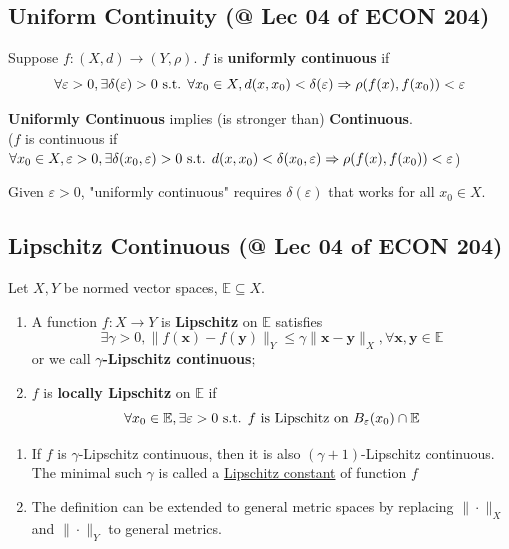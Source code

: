 \documentclass[11pt]{elegantbook}
\begin{document}
\subsection{Uniform Continuity \small{(@ Lec 04 of ECON 204)}}
\begin{definition}
\normalfont
    Suppose $f : (X, d) \rightarrow (Y, \rho)$. $f$ is \textbf{uniformly continuous} if $$\forall \varepsilon>0, \exists \delta(\varepsilon)>0 \textnormal{ s.t. }\forall x_0\in X, d(x,x_0)<\delta(\varepsilon) \Rightarrow \rho(f(x), f(x_0))<\varepsilon$$
\end{definition}
\begin{claim}
    \textbf{Uniformly Continuous} implies (is stronger than) \textbf{Continuous}.\\
    ($f$ is continuous if $\forall x_0\in X, \varepsilon>0, \exists \delta(x_0,\varepsilon)>0 \textnormal{ s.t. } d(x,x_0)<\delta(x_0,\varepsilon) \Rightarrow \rho(f(x), f(x_0))<\varepsilon$)
\end{claim}
Given $\varepsilon>0$, "uniformly continuous" requires $\delta(\varepsilon)$ that works for all $x_0\in X$.



\subsection{Lipschitz Continuous \small{(@ Lec 04 of ECON 204)}}
\begin{definition}
    Let $X, Y$ be normed vector spaces, $\mathbb{E} \subseteq X$.
    \begin{enumerate}[(1).]
        \item A function $f: X \rightarrow Y$ is \textbf{Lipschitz} on $\mathbb{E}$ satisfies
        $$\exists \gamma>0, 
        \|f(\mathbf{x})-f(\mathbf{y})\|_Y \leq \gamma\|\mathbf{x}-\mathbf{y}\|_X, \forall \mathbf{x}, \mathbf{y}\in \mathbb{E}
        $$
        or we call \textbf{$\gamma$-Lipschitz continuous};
        \item $f$ is \textbf{locally Lipschitz} on $\mathbb{E}$ if
        $$\forall x_0\in \mathbb{E}, \exists \varepsilon>0 \textnormal{ s.t. $f$ is Lipschitz on }B_\varepsilon(x_0)\cap \mathbb{E}$$
    \end{enumerate}
\end{definition}
\begin{claim}
    \begin{enumerate}[1).]
        \item If $f$ is $\gamma$-Lipschitz continuous, then it is also $(\gamma+1)$-Lipschitz continuous. The minimal such $\gamma$ is called a \underline{Lipschitz constant} of function $f$
        \item The definition can be extended to general metric spaces by replacing $\|\cdot\|_X$ and $\|\cdot\|_Y$ to general metrics.
    \end{enumerate}
\end{claim}
\end{document}
